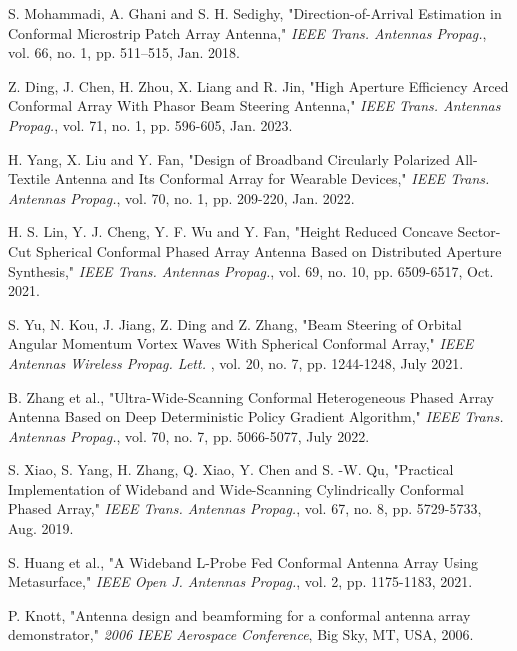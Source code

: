 \documentclass[USenglish]{article}
\theoremstyle{dgthm}
\theoremstyle{dgdef}
\begin{document}
\begin{thebibliography}{99}

S. Mohammadi, A. Ghani and S. H. Sedighy, "Direction-of-Arrival Estimation in Conformal Microstrip Patch Array Antenna," \emph{IEEE Trans.  Antennas Propag.}, vol. 66, no. 1, pp. 511--515, Jan. 2018.

Z. Ding, J. Chen, H. Zhou, X. Liang and R. Jin, "High Aperture Efficiency Arced Conformal Array With Phasor Beam Steering Antenna," \emph{IEEE Trans. Antennas Propag.}, vol. 71, no. 1, pp. 596-605, Jan. 2023.

H. Yang, X. Liu and Y. Fan, "Design of Broadband Circularly Polarized All-Textile Antenna and Its Conformal Array for Wearable Devices," \emph{IEEE Trans. Antennas Propag.}, vol. 70, no. 1, pp. 209-220, Jan. 2022.

H. S. Lin, Y. J. Cheng, Y. F. Wu and Y. Fan, "Height Reduced Concave Sector-Cut Spherical Conformal Phased Array Antenna Based on Distributed Aperture Synthesis," \emph{IEEE Trans.  Antennas Propag.}, vol. 69, no. 10, pp. 6509-6517, Oct. 2021.

S. Yu, N. Kou, J. Jiang, Z. Ding and Z. Zhang, "Beam Steering of Orbital Angular Momentum Vortex Waves With Spherical Conformal Array," \emph{IEEE Antennas Wireless Propag. Lett.} , vol. 20, no. 7, pp. 1244-1248, July 2021.

B. Zhang et al., "Ultra-Wide-Scanning Conformal Heterogeneous Phased Array Antenna Based on Deep Deterministic Policy Gradient Algorithm," \emph{IEEE Trans.  Antennas Propag.}, vol. 70, no. 7, pp. 5066-5077, July 2022.

S. Xiao, S. Yang, H. Zhang, Q. Xiao, Y. Chen and S. -W. Qu, "Practical Implementation of Wideband and Wide-Scanning Cylindrically Conformal Phased Array," \emph{IEEE Trans.  Antennas Propag.}, vol. 67, no. 8, pp. 5729-5733, Aug. 2019.

S. Huang et al., "A Wideband L-Probe Fed Conformal Antenna Array Using Metasurface," \emph{IEEE Open J. Antennas Propag.}, vol. 2, pp. 1175-1183, 2021.

P. Knott, "Antenna design and beamforming for a conformal antenna array demonstrator," \emph{2006 IEEE Aerospace Conference}, Big Sky, MT, USA, 2006.


\end{thebibliography}
\end{document}
